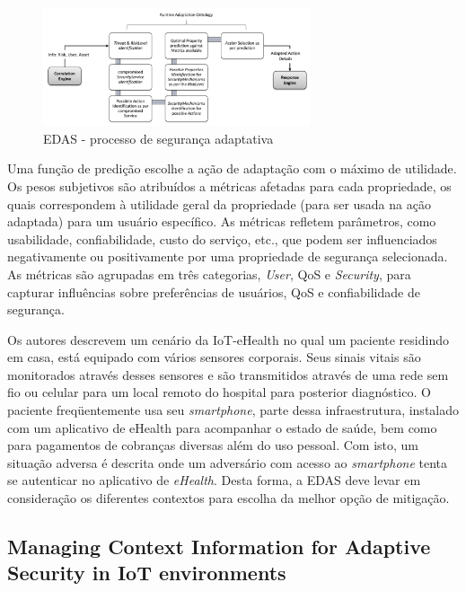 \documentclass[tid,table]{texufpel} %
\begin{document}
\begin{figure}[ht]
\centering
\includegraphics[width=0.7\textwidth]{imagens/edas-adaptation-process.png}
\caption{EDAS - processo de segurança adaptativa}
\label{edas-adaptation-process}
\end{figure}

Uma função de predição escolhe a ação de adaptação com o máximo de utilidade. Os pesos subjetivos são atribuídos a métricas afetadas para cada propriedade, os quais correspondem à utilidade geral da propriedade (para ser usada na ação adaptada) para um usuário específico. As métricas refletem parâmetros, como usabilidade, confiabilidade, custo do serviço, etc., que podem ser influenciados negativamente ou positivamente por uma propriedade de segurança selecionada. As métricas são agrupadas em três categorias, \textit{User}, QoS e \textit{Security}, para capturar influências sobre preferências de usuários, QoS e confiabilidade de segurança.

Os autores descrevem um cenário da IoT-eHealth no qual um paciente residindo em casa, está equipado com vários sensores corporais. Seus sinais vitais são monitorados através desses sensores e são transmitidos através de uma rede sem fio ou celular para um local remoto do hospital para posterior diagnóstico. O paciente freqüentemente usa seu \textit{smartphone}, parte dessa infraestrutura, instalado com um aplicativo de eHealth para acompanhar o estado de saúde, bem como para pagamentos de cobranças diversas além do uso pessoal. Com isto, um situação adversa é descrita onde um adversário com acesso ao  \textit{smartphone} tenta se autenticar no aplicativo de \textit{eHealth}. Desta forma, a EDAS deve levar em consideração os diferentes contextos para escolha da melhor opção de mitigação.


\subsection{Managing Context Information for Adaptive Security in IoT environments} %
\end{document}
